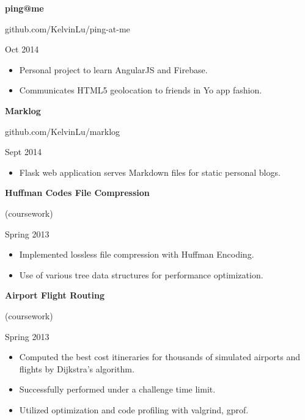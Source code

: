 \documentclass[letterpaper]{article}
\newcommand{\projectpanel}[3]{
	\textbf{{#1}}
	\begin{footnotesize}
		{#2}
	\end{footnotesize}
	\begin{scriptsize} 
		{#3}
	\end{scriptsize}
}
\newenvironment{statementlist}{
		\begin{small}
		\begin{itemize}
		\setlength\itemsep{0em}
}{
		\end{itemize}
		\end{small}
		\vspace*{1em}
}
\begin{document}
\begin{minipage}[t]{0.55\textwidth}
		\projectpanel{ping@me}{github.com/KelvinLu/ping-at-me}{Oct 2014}
		\begin{statementlist}
			\item Personal project to learn AngularJS and Firebase.
			\item Communicates HTML5 geolocation to friends in Yo app fashion.
		\end{statementlist}	

		\projectpanel{Marklog}{github.com/KelvinLu/marklog}{Sept 2014}
		\begin{statementlist}
			\item Flask web application serves Markdown files for static personal blogs.
		\end{statementlist}	
		
		\projectpanel{Huffman Codes File Compression}{(coursework)}{Spring 2013}
		\begin{statementlist}
			\item Implemented lossless file compression with Huffman Encoding.
			\item Use of various tree data structures for performance optimization.
		\end{statementlist}	

		\projectpanel{Airport Flight Routing}{(coursework)}{Spring 2013}
		\begin{statementlist}
			\item Computed the best cost itineraries for thousands of simulated airports and flights by Dijkstra's algorithm.
			\item Successfully performed under a challenge time limit.
			\item Utilized optimization and code profiling with valgrind, gprof.
		\end{statementlist}	
				
	\end{minipage}	
	\hspace{0.05\textwidth}
\end{document}
